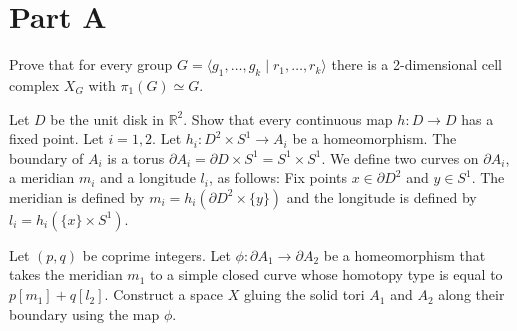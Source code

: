 \documentclass{exam}
\begin{document}
\centering
{}
\vspace{1em}

\centering
\section*{Part A}
\begin{questions}
    \question
        Prove that for every group $G = \langle g_1, \dots, g_k \mid r_1, \dots, r_k\rangle$ there is a 2-dimensional cell complex $X_G$ with $\pi_1(G)\simeq G$.
    \question
    \question
        Let $D$ be the unit disk in $\mathbb{R}^2$. Show that every continuous map $h : D \to D$ has a fixed point.
    \question
        Let $i=1, 2$. Let $h_i : D^2 \times S^1 \to A_i$ be a homeomorphism. The boundary of $A_i$ is a torus $\partial A_i = \partial D \times S^1 = S^1 \times S^1$. We define two curves on $\partial A_i$, a meridian $m_i$ and a longitude $l_i$, as follows: Fix points $x\in\partial D^2$ and $y\in S^1$. The meridian is defined by $m_i = h_i(\partial D^2 \times \{y\})$ and the longitude is defined by $l_i = h_i(\{x\}\times S^1)$.

        Let $(p,q)$ be coprime integers. Let $\phi : \partial A_1 \to \partial A_2$ be a homeomorphism that takes the meridian $m_1$ to a simple closed curve whose homotopy type is equal to $p[m_1]+q[l_2]$. Construct a space $X$ gluing the solid tori $A_1$ and $A_2$ along their boundary using the map $\phi$.


\end{questions}
\end{document}
